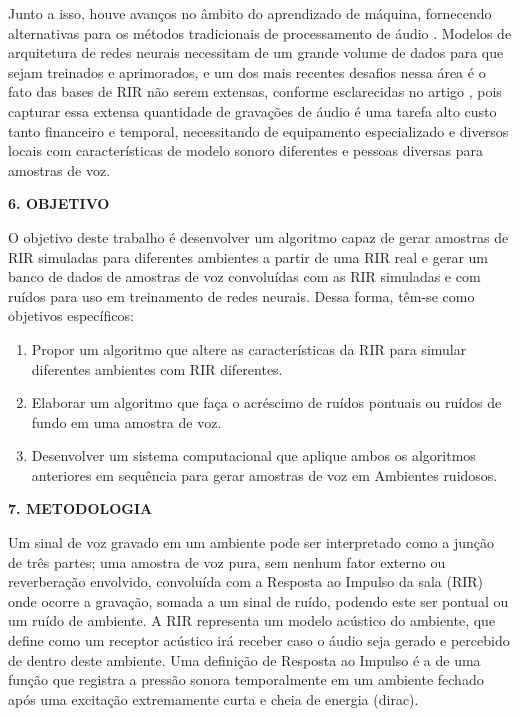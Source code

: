 \documentclass[a4paper,12pt,oneside,openany]{report}
\begin{document}
Junto a isso, houve avanços no âmbito do aprendizado de máquina, fornecendo alternativas para os métodos tradicionais
de processamento de áudio \cite{ML_Speech_Rec}.
Modelos de arquitetura de redes neurais necessitam de um grande volume de dados para que sejam treinados e aprimorados, e um dos mais recentes
desafios nessa área é o fato das bases de RIR não serem extensas, conforme esclarecidas no artigo \cite{Estimation_RT_DRR},
pois capturar essa extensa quantidade de gravações de áudio é uma tarefa alto custo tanto financeiro e temporal, necessitando de equipamento especializado
e diversos locais com características de modelo sonoro diferentes e pessoas diversas para amostras de voz.


\vspace{0.4cm}
\textbf{6. OBJETIVO}

O objetivo deste trabalho é desenvolver um algoritmo capaz de gerar amostras de RIR simuladas para diferentes ambientes a partir de uma RIR real e
gerar um banco de dados de amostras de voz convoluídas com as RIR simuladas e com ruídos para uso em treinamento de redes neurais.
Dessa forma, têm-se como objetivos específicos:

\begin{enumerate}
      \item Propor um algoritmo que altere as características da RIR para simular diferentes ambientes com RIR diferentes.
      \item Elaborar um algoritmo que faça o acréscimo de ruídos pontuais ou ruídos de fundo em uma amostra de voz.
      \item Desenvolver um sistema computacional que aplique ambos os algoritmos anteriores em sequência para gerar
      amostras de voz em Ambientes ruidosos.
\end{enumerate}

\vspace{0.4cm}
\textbf{7. METODOLOGIA}

Um sinal de voz gravado em um ambiente pode ser interpretado como a junção de três partes; uma amostra de voz pura, sem nenhum fator externo
ou reverberação envolvido, convoluída com a Resposta ao Impulso da sala (RIR) onde ocorre a gravação, somada a um sinal de ruído, podendo este 
ser pontual ou um ruído de ambiente. A RIR representa um modelo acústico do ambiente, que define como um receptor acústico irá receber caso o áudio
seja gerado e percebido de dentro deste ambiente. Uma definição de Resposta ao Impulso é a de uma função que registra a pressão sonora temporalmente
em um ambiente fechado após uma excitação extremamente curta e cheia de energia (dirac).
\end{document}
